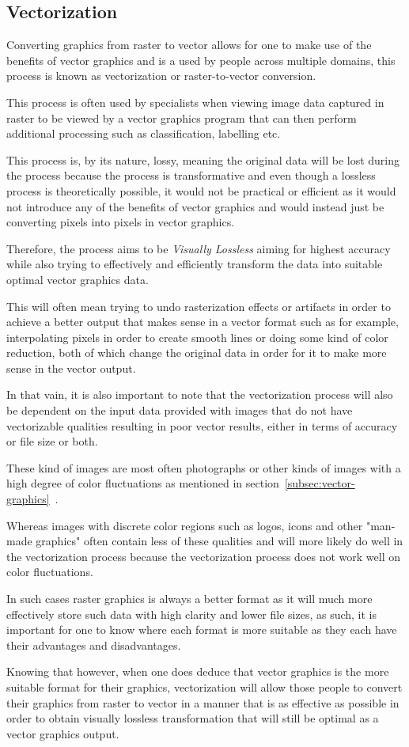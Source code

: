 \documentclass[12pt]{article}
\newcommand{\sentence}{} %
\newcommand{\italic}[1]{\textit{#1}}
\newcommand{\fullref}[1]{\ref{#1}~\nameref{#1}}
\begin{document}
    \subsection{Vectorization}\label{subsec:vectorization}

    \tab
    Converting graphics from raster to vector allows for one to make use of the benefits of vector graphics and is a
    used by people across multiple domains, this process is known as vectorization or raster-to-vector conversion.
    \sentence
    This process is often used by specialists when viewing image data captured in raster to be viewed by a vector
    graphics program that can then perform additional processing such as classification, labelling etc.
    \sentence
    This process is, by its nature, lossy, meaning the original data will be lost during the process because the
    process is transformative and even though a lossless process is theoretically possible, it would not be practical
    or efficient as it would not introduce any of the benefits of vector graphics and would instead just be
    converting pixels into pixels in vector graphics.
    \sentence
    Therefore, the process aims to be \italic{Visually Lossless} aiming for highest accuracy while also trying to
    effectively and efficiently transform the data into suitable optimal vector graphics data.
    \sentence
    This will often mean trying to undo rasterization effects or artifacts in order to achieve a better output that
    makes sense in a vector format such as for example, interpolating pixels in order to create smooth lines
    or doing some kind of color reduction, both of which change the original data in order for it to make more sense
    in the vector output.

    \bigskip
    \sentence
    In that vain, it is also important to note that the vectorization process will also be dependent on the input
    data provided with images that do not have vectorizable qualities resulting in poor vector results, either in
    terms of accuracy or file size or both.
    \sentence
    These kind of images are most often photographs or other kinds of images with a high degree of color fluctuations
    as mentioned in section~\fullref{subsec:vector-graphics}.
    \sentence
    Whereas images with discrete color regions such as logos, icons and other "man-made graphics" often contain less
    of these qualities and will more likely do well in the vectorization process because the vectorization process
    does not work well on color fluctuations.
    \sentence
    In such cases raster graphics is always a better format as it will much more effectively store such data with
    high clarity and lower file sizes, as such, it is important for one to know where each format is more suitable as
    they each have their advantages and disadvantages.
    \sentence
    Knowing that however, when one does deduce that vector graphics is the more suitable format for their graphics,
    vectorization will allow those people to convert their graphics from raster to vector in a manner that is as
    effective as possible in order to obtain visually lossless transformation that will still be optimal as a vector
    graphics output.
\end{document}
